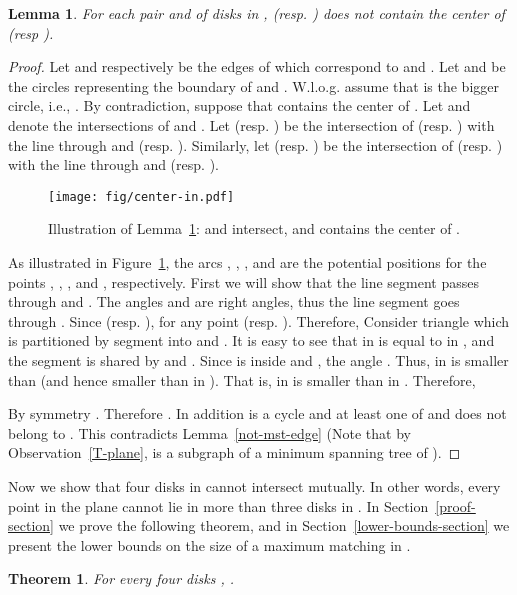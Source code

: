 \documentclass[11pt,a4paper]{article}
\newcommand{\kGG}[2]{}
\newtheorem{lemma}{Lemma}
\newtheorem{theorem}{Theorem}
\begin{document}
\begin{lemma}
\label{center-in-lemma}
 For each pair  and  of disks in ,  (resp. ) does not contain the center of  (resp ).
\end{lemma}

\begin{proof}
 Let  and  respectively be the edges of  which correspond to  and . Let  and  be the circles representing the boundary of  and . W.l.o.g. assume that  is the bigger circle, i.e., . By contradiction, suppose that  contains the center  of . Let  and  denote the intersections of  and . Let  (resp. ) be the intersection of  (resp. ) with the line through  and  (resp. ). Similarly, let  (resp. ) be the intersection of  (resp. ) with the line through  and  (resp. ). 

\begin{figure}[htb]
  \centering
  \texttt{[image: fig/center-in.pdf]}
 \caption{Illustration of Lemma~\ref{center-in-lemma}:  and  intersect, and  contains the center of .}
  \label{center-in-fig}
\end{figure}

As illustrated in Figure~\ref{center-in-fig}, the arcs , , , and  are the potential positions for the points , , , and , respectively. First we will show that the line segment  passes through  and . The angles  and  are right angles, thus the line segment  goes through . Since  (resp. ), for any point  (resp. ). Therefore, 
Consider triangle  which is partitioned by segment  into  and . It is easy to see that  in  is equal to  in , and the segment  is shared by  and . Since  is inside  and , the angle . Thus,  in  is smaller than  (and hence smaller than  in ). That is,   in  is smaller than  in . Therefore,



By symmetry . Therefore . In addition  is a cycle and at least one of  and  does not belong to . This contradicts Lemma~\ref{not-mst-edge} (Note that by Observation~\ref{T-plane},  is a subgraph of a minimum spanning tree of ).
\end{proof}

Now we show that four disks in  cannot intersect mutually. In other words, every point in the plane cannot lie in more than three disks in . In Section~\ref{proof-section} we prove the following theorem, and in Section~\ref{lower-bounds-section} we present the lower bounds on the size of a maximum matching in \kGG{k}{}.

\begin{theorem}
 \label{four-circle-theorem}
For every four disks , .
\end{theorem}
\end{document}
